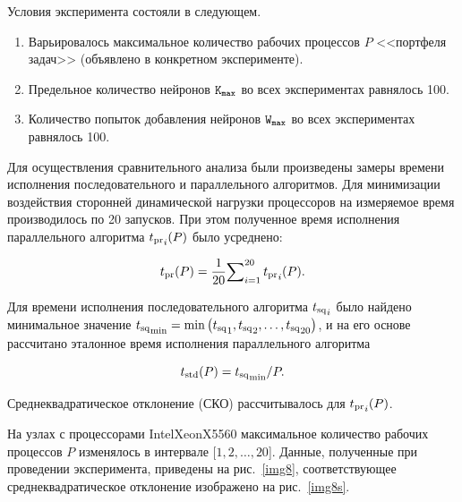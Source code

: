 Условия эксперимента состояли в следующем.

\begin{enumerate}

\item[1.] Варьировалось максимальное количество рабочих процессов $P$ <<портфеля задач>> (объявлено в конкретном эксперименте).

\item[2.] Предельное количество нейронов $\tt K_{max}$ во всех экспериментах равнялось 100.

\item[3.] Количество попыток добавления нейронов $\tt W_{max}$ во всех экспериментах равнялось 100.

\end{enumerate}



Для осуществления сравнительного анализа были произведены замеры времени исполнения последовательного и параллельного алгоритмов. Для минимизации воздействия сторонней динамической нагрузки процессоров на измеряемое время производилось по 20 запусков. При этом полученное время исполнения параллельного алгоритма $ {t_{\rm pr}}_{i} (P)$ было усреднено:

\begin{equation}

t_{\rm pr}(P)=\frac1{20}{\sum\nolimits_{i=1}^{20}{t_{\rm pr}}_{i}(P)}.\label{eqPr}

\end{equation}



Для времени исполнения последовательного алгоритма ${t_{\rm sq}}_{i}$ было найдено минимальное значение ${t_{\rm sq}}_{\min}=\min{\left({t_{\rm sq}}_{1}, {t_{\rm sq}}_{2}, \dots, {t_{\rm sq}}_{20}\right)}$, и на его основе рассчитано эталонное время исполнения параллельного алгоритма

\begin{equation}

t_{\rm std}(P )={{t_{\rm sq}}_{\min}}/{P}.

\label{eqStd}

\end{equation}

Среднеквадратическое отклонение (СКО) рассчитывалось для ${t_{\rm pr}}_{i}(P)$.



На узлах с процессорами Intel\textregistered Xeon\textregistered X5560 максимальное количество рабочих процессов $P$ изменялось в интервале [$1, 2, \ldots, 20$]. Данные, полученные при проведении эксперимента, приведены на рис.~\ref{img8}, соответствующее среднеквадратическое отклонение изображено на рис.~\ref{img8s}.





